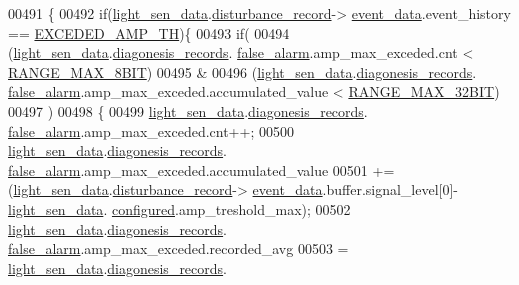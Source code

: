 \begin{DoxyCode}
00491                                         \{
00492         \textcolor{keywordflow}{if}(\hyperlink{a00047_a53c98c9f84d5cecf0747bbe1f6b83696}{light\_sen\_data}.\hyperlink{a00024_ac9b38e2c1d3f1013a88d33506c754152}{disturbance\_record}->
      \hyperlink{a00028_a8c0bda69e71ef674e60da47ad0be9ab0}{event\_data}.event\_history == \hyperlink{a00019_a9c5372190518a7d696da393f1a9a5fb9}{EXCEDED\_AMP\_TH})\{
00493                \textcolor{keywordflow}{if}(
00494                 (\hyperlink{a00047_a53c98c9f84d5cecf0747bbe1f6b83696}{light\_sen\_data}.\hyperlink{a00024_a7ae905b560513ad201e58c2f63375030}{diagonesis\_records}.
      \hyperlink{a00017_a799f50625c0c03f9404a59287810113d}{false\_alarm}.amp\_max\_exceded.cnt < \hyperlink{a00021_ae0c75a1cb44e5d3f00ec7c9e40acfda8}{RANGE\_MAX\_8BIT})
00495                 &
00496                 (\hyperlink{a00047_a53c98c9f84d5cecf0747bbe1f6b83696}{light\_sen\_data}.\hyperlink{a00024_a7ae905b560513ad201e58c2f63375030}{diagonesis\_records}.
      \hyperlink{a00017_a799f50625c0c03f9404a59287810113d}{false\_alarm}.amp\_max\_exceded.accumulated\_value < \hyperlink{a00021_a334bd006b6d2b397dbfc620d62c3c35c}{RANGE\_MAX\_32BIT})
00497                )
00498                \{
00499                      \hyperlink{a00047_a53c98c9f84d5cecf0747bbe1f6b83696}{light\_sen\_data}.\hyperlink{a00024_a7ae905b560513ad201e58c2f63375030}{diagonesis\_records}.
      \hyperlink{a00017_a799f50625c0c03f9404a59287810113d}{false\_alarm}.amp\_max\_exceded.cnt++;
00500                      \hyperlink{a00047_a53c98c9f84d5cecf0747bbe1f6b83696}{light\_sen\_data}.\hyperlink{a00024_a7ae905b560513ad201e58c2f63375030}{diagonesis\_records}.
      \hyperlink{a00017_a799f50625c0c03f9404a59287810113d}{false\_alarm}.amp\_max\_exceded.accumulated\_value
00501                      +=(\hyperlink{a00047_a53c98c9f84d5cecf0747bbe1f6b83696}{light\_sen\_data}.\hyperlink{a00024_ac9b38e2c1d3f1013a88d33506c754152}{disturbance\_record}->
      \hyperlink{a00028_a8c0bda69e71ef674e60da47ad0be9ab0}{event\_data}.buffer.signal\_level[0]-\hyperlink{a00047_a53c98c9f84d5cecf0747bbe1f6b83696}{light\_sen\_data}.
      \hyperlink{a00024_a94b2d1f6ea4ab334c74d24984dd27843}{configured}.amp\_treshold\_max);
00502                      \hyperlink{a00047_a53c98c9f84d5cecf0747bbe1f6b83696}{light\_sen\_data}.\hyperlink{a00024_a7ae905b560513ad201e58c2f63375030}{diagonesis\_records}.
      \hyperlink{a00017_a799f50625c0c03f9404a59287810113d}{false\_alarm}.amp\_max\_exceded.recorded\_avg
00503                      = \hyperlink{a00047_a53c98c9f84d5cecf0747bbe1f6b83696}{light\_sen\_data}.\hyperlink{a00024_a7ae905b560513ad201e58c2f63375030}{diagonesis\_records}.

\end{DoxyCode}
